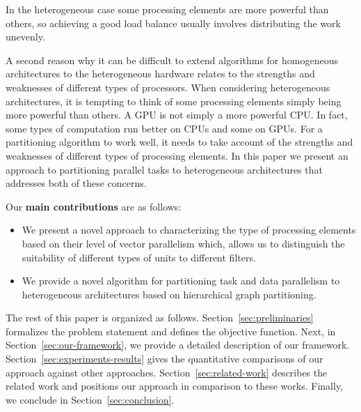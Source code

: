 In the heterogeneous case some processing elements are more powerful
than others, so achieving a good load balance usually involves
distributing the work unevenly.

A second reason why it can be difficult to extend algorithms for
homogeneous architectures to the heterogeneous hardware relates to the
strengths and weaknesses of different types of processors. When
considering heterogeneous architectures, it is tempting to think of
some processing elements simply being more powerful than others.
A GPU is not simply a more powerful CPU. In fact, some types of
computation run better on CPUs and some on GPUs.  For a partitioning
algorithm to work well, it needs to take account of the strengths and
weaknesses of different types of processing elements. In this paper we
present an approach to partitioning parallel tasks to heterogeneous
architectures that addresses both of these concerns.

\vspace{0.2cm}

Our \textbf{main contributions} are as follows:
\begin{itemize}
\item We present a novel approach to characterizing the type of
  processing elements based on their level of vector parallelism which,
  allows us to distinguish the suitability of different types of units
  to different filters.
\item We provide a novel algorithm for partitioning task and data parallelism
  to heterogeneous architectures based on hierarchical graph
  partitioning.
\end{itemize}

The rest of this paper is organized as follows.
Section~\ref{sec:preliminaries} formalizes the problem statement and
defines the objective function. Next, in
Section~\ref{sec:our-framework}, we provide a detailed description of
our framework. Section~\ref{sec:experiments-results} gives the quantitative
comparisons of our approach against other
approaches. Section~\ref{sec:related-work} describes the related work
and positions our approach in comparison to these works.  Finally, we
conclude in Section~\ref{sec:conclusion}.
